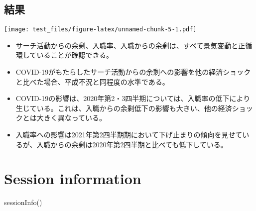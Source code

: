 \documentclass[
]{book}
\newenvironment{Shaded}{\begin{snugshade}}{\end{snugshade}}
\newcommand{\FunctionTok}[1]{\textcolor[rgb]{0.00,0.00,0.00}{#1}}
\newcommand{\NormalTok}[1]{#1}
\begin{document}
\hypertarget{ux7d50ux679c-1}{%
\section{結果}\label{ux7d50ux679c-1}}

\texttt{[image: test\_files/figure-latex/unnamed-chunk-5-1.pdf]}

\begin{itemize}
\item
  サーチ活動からの余剰、入職率、入職からの余剰は、すべて景気変動と正循環していることが確認できる。
\item
  COVID-19がもたらしたサーチ活動からの余剰への影響を他の経済ショックと比べた場合、平成不況と同程度の水準である。
\item
  COVID-19の影響は、2020年第2・3四半期については、入職率の低下により生じている。これは、入職からの余剰低下の影響も大きい、他の経済ショックとは大きく異なっている。
\item
  入職率への影響は2021年第2四半期期において下げ止まりの傾向を見せているが、入職からの余剰は2020年第2四半期と比べても低下している。
\end{itemize}

\hypertarget{session-information}{%
\chapter{Session information}\label{session-information}}

\begin{Shaded}
\begin{Highlighting}[]
\FunctionTok{sessionInfo}\NormalTok{()}
\end{Highlighting}
\end{Shaded}
\end{document}
